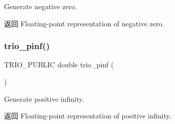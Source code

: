 Generate negative zero.

\begin{DoxyReturn}{返回}
Floating-\/point representation of negative zero. 
\end{DoxyReturn}
\mbox{\label{group___special_quantities_ga32a239c5ff735f34ec4d813e0b7c59f7}} 
\subsubsection{\texorpdfstring{trio\+\_\+pinf()}{trio\_pinf()}}
{\footnotesize\ttfamily T\+R\+I\+O\+\_\+\+P\+U\+B\+L\+IC double trio\+\_\+pinf (\begin{DoxyParamCaption}\item[{T\+R\+I\+O\+\_\+\+N\+O\+A\+R\+GS}]{ }\end{DoxyParamCaption})}

Generate positive infinity.

\begin{DoxyReturn}{返回}
Floating-\/point representation of positive infinity. 
\end{DoxyReturn}
